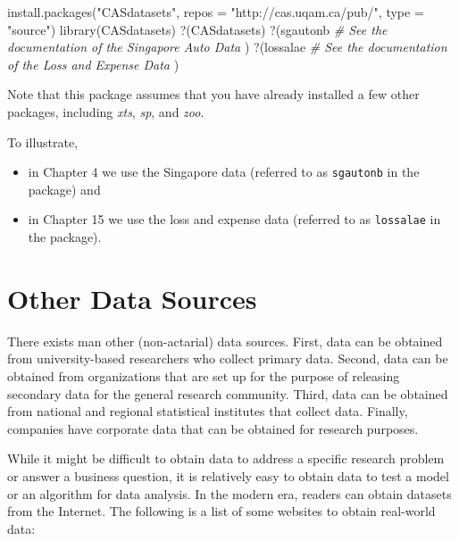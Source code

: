 \documentclass[
]{book}
\newenvironment{Shaded}{\begin{snugshade}}{\end{snugshade}}
\newcommand{\AttributeTok}[1]{\textcolor[rgb]{0.77,0.63,0.00}{#1}}
\newcommand{\CommentTok}[1]{\textcolor[rgb]{0.56,0.35,0.01}{\textit{#1}}}
\newcommand{\FunctionTok}[1]{\textcolor[rgb]{0.00,0.00,0.00}{#1}}
\newcommand{\NormalTok}[1]{#1}
\newcommand{\StringTok}[1]{\textcolor[rgb]{0.31,0.60,0.02}{#1}}
\providecommand{\tightlist}{%
  \setlength{\itemsep}{0pt}\setlength{\parskip}{0pt}}
\begin{document}
\begin{Shaded}
\begin{Highlighting}[]
\FunctionTok{install.packages}\NormalTok{(}\StringTok{"CASdatasets"}\NormalTok{, }\AttributeTok{repos =} \StringTok{"http://cas.uqam.ca/pub/"}\NormalTok{, }\AttributeTok{type =} \StringTok{"source"}\NormalTok{)}
\FunctionTok{library}\NormalTok{(CASdatasets)}
\StringTok{\textasciigrave{}}\AttributeTok{?}\StringTok{\textasciigrave{}}\NormalTok{(CASdatasets)}
\StringTok{\textasciigrave{}}\AttributeTok{?}\StringTok{\textasciigrave{}}\NormalTok{(sgautonb  }\CommentTok{\# See the documentation of the Singapore Auto Data}
\NormalTok{)}
\StringTok{\textasciigrave{}}\AttributeTok{?}\StringTok{\textasciigrave{}}\NormalTok{(lossalae  }\CommentTok{\# See the documentation of the Loss and Expense Data}
\NormalTok{)}
\end{Highlighting}
\end{Shaded}

Note that this package assumes that you have already installed a few other packages, including \emph{xts}, \emph{sp}, and \emph{zoo}.

To illustrate,

\begin{itemize}
\tightlist
\item
  in Chapter 4 we use the Singapore data (referred to as \texttt{sgautonb} in the package) and
\item
  in Chapter 15 we use the loss and expense data (referred to as \texttt{lossalae} in the package).
\end{itemize}

\hypertarget{other-data-sources}{%
\section{Other Data Sources}\label{other-data-sources}}

There exists man other (non-actarial) data sources. First, data can be obtained from university-based researchers who collect primary data. Second, data can be obtained from organizations that are set up for the purpose of releasing secondary data for the general research community. Third, data can be obtained from national and regional statistical institutes that collect data. Finally, companies have corporate data that can be obtained for research purposes.

While it might be difficult to obtain data to address a specific research problem or answer a business question, it is relatively easy to obtain data to test a model or an algorithm for data analysis. In the modern era, readers can obtain datasets from the Internet. The following is a list of some websites to obtain real-world data:
\end{document}
